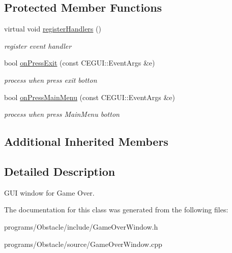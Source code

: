 \subsection*{Protected Member Functions}
\begin{DoxyCompactItemize}
\item 
virtual void \hyperlink{class_n_c_t_u_1_1_game_over_window_aac33006dbd35e83618067e7b8263f098}{register\+Handlers} ()\hypertarget{class_n_c_t_u_1_1_game_over_window_aac33006dbd35e83618067e7b8263f098}{}\label{class_n_c_t_u_1_1_game_over_window_aac33006dbd35e83618067e7b8263f098}

\begin{DoxyCompactList}\small\item\em register event handler \end{DoxyCompactList}\item 
bool \hyperlink{class_n_c_t_u_1_1_game_over_window_ab696a97c72ec421f05ed1fcb553e37ee}{on\+Press\+Exit} (const C\+E\+G\+U\+I\+::\+Event\+Args \&e)\hypertarget{class_n_c_t_u_1_1_game_over_window_ab696a97c72ec421f05ed1fcb553e37ee}{}\label{class_n_c_t_u_1_1_game_over_window_ab696a97c72ec421f05ed1fcb553e37ee}

\begin{DoxyCompactList}\small\item\em process when press exit botton \end{DoxyCompactList}\item 
bool \hyperlink{class_n_c_t_u_1_1_game_over_window_a1eb028d09adc5f6dbbbbec6aa52ac156}{on\+Press\+Main\+Menu} (const C\+E\+G\+U\+I\+::\+Event\+Args \&e)\hypertarget{class_n_c_t_u_1_1_game_over_window_a1eb028d09adc5f6dbbbbec6aa52ac156}{}\label{class_n_c_t_u_1_1_game_over_window_a1eb028d09adc5f6dbbbbec6aa52ac156}

\begin{DoxyCompactList}\small\item\em process when press Main\+Menu botton \end{DoxyCompactList}\end{DoxyCompactItemize}
\subsection*{Additional Inherited Members}


\subsection{Detailed Description}
G\+UI window for Game Over. 

The documentation for this class was generated from the following files\+:\begin{DoxyCompactItemize}
\item 
programs/\+Obstacle/include/Game\+Over\+Window.\+h\item 
programs/\+Obstacle/source/Game\+Over\+Window.\+cpp\end{DoxyCompactItemize}
